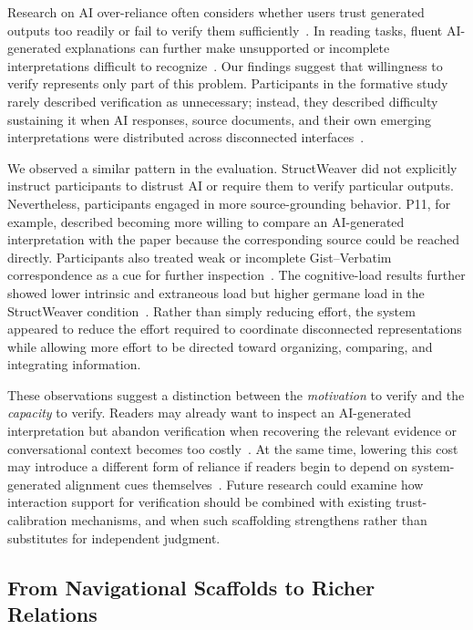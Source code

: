 \documentclass[manuscript,review,anonymous]{acmart}
\begin{document}
Research on AI over-reliance often considers whether users trust generated outputs too readily or fail to verify them sufficiently~\cite{bucinca2021,romeo_conti2026,vered2023}. In reading tasks, fluent AI-generated explanations can further make unsupported or incomplete interpretations difficult to recognize~\cite{pastorino2025framing}. Our findings suggest that willingness to verify represents only part of this problem. Participants in the formative study rarely described verification as unnecessary; instead, they described difficulty sustaining it when AI responses, source documents, and their own emerging interpretations were distributed across disconnected interfaces~\cite{10.1145/169059.169209,papertrail}.

We observed a similar pattern in the evaluation. StructWeaver did not explicitly instruct participants to distrust AI or require them to verify particular outputs. Nevertheless, participants engaged in more source-grounding behavior. P11, for example, described becoming more willing to compare an AI-generated interpretation with the paper because the corresponding source could be reached directly. Participants also treated weak or incomplete Gist--Verbatim correspondence as a cue for further inspection~\cite{zhou2026improvinghumanverificationllm}. The cognitive-load results further showed lower intrinsic and extraneous load but higher germane load in the StructWeaver condition~\cite{sweller2011cognitive}. Rather than simply reducing effort, the system appeared to reduce the effort required to coordinate disconnected representations while allowing more effort to be directed toward organizing, comparing, and integrating information.

These observations suggest a distinction between the \textit{motivation} to verify and the \textit{capacity} to verify. Readers may already want to inspect an AI-generated interpretation but abandon verification when recovering the relevant evidence or conversational context becomes too costly~\cite{verification_burden_slr_iui,papertrail}. At the same time, lowering this cost may introduce a different form of reliance if readers begin to depend on system-generated alignment cues themselves~\cite{zhou2026improvinghumanverificationllm,bucinca2021}. Future research could examine how interaction support for verification should be combined with existing trust-calibration mechanisms, and when such scaffolding strengthens rather than substitutes for independent judgment.

\subsection{From Navigational Scaffolds to Richer Relations}
\end{document}
